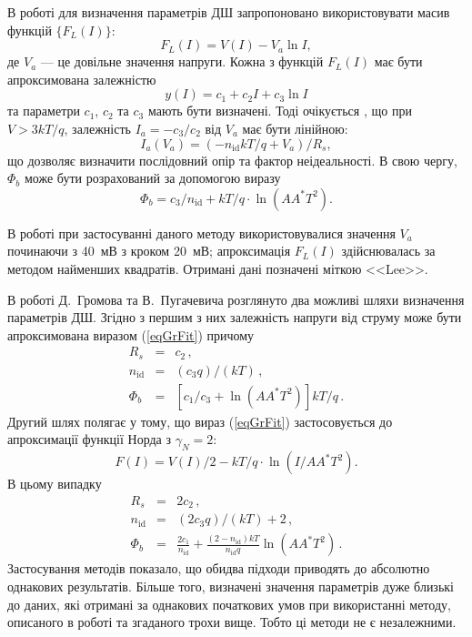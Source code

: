 В роботі \cite{Lee} для визначення параметрів ДШ запропоновано використовувати масив функцій $\{F_L(I)\}$:
\begin{equation}
\label{eqLee}
F_L(I)=V(I)-V_a\ln I,
\end{equation}
де
$V_a$ --- це довільне значення напруги.
Кожна з функцій $F_L(I)$ має бути апроксимована залежністю
\begin{equation}
\label{eqGrFit}
y(I)=c_1+c_2I+c_3\ln I
\end{equation}
та параметри $c_1$, $c_2$ та $c_3$ мають бути визначені.
Тоді очікується \cite{Lee}, що при $V>3kT/q$,
залежність $I_a=-c_3/c_2$ від $V_a$ має бути лінійною:
\begin{equation}
\label{eqLeeDet}
I_a(V_a)=(-n_\mathrm{id}kT/q+V_a)/R_s,
\end{equation}
що дозволяє визначити послідовний опір та фактор неідеальності.
В свою чергу, $\Phi_b$ може бути розрахований \cite{Lee} за допомогою виразу
\begin{equation}
\label{eqLeeFb}
\Phi_b=c_3/n_\mathrm{id}+kT/q\cdot\ln\left(AA^*T^2\right).
\end{equation}

В роботі при застосуванні даного методу використовувалися значення $V_a$ починаючи з 40~мВ з кроком 20~мВ;
апроксимація $F_L(I)$ здійснювалась за методом найменших квадратів.
Отримані дані позначені міткою <<Lee>>.

В роботі Д.~Громова та В.~Пугачевича \cite{Gromov} розглянуто два можливі шляхи визначення параметрів ДШ.
Згідно з першим з них залежність напруги від струму може бути апроксимована виразом (\ref{eqGrFit}) причому
\begin{eqnarray}
\label{eqGr1}
R_s&=&c_2\,,
\\
n_\mathrm{id}&=&(c_3q)/(kT)\,,
\\
\Phi_b&=&\left[c_1/c_3+\ln\left(AA^*T^2\right)\right]kT/q\,.
\end{eqnarray}
Другий шлях полягає у тому, що вираз (\ref{eqGrFit}) застосовується до апроксимації функції Норда з $\gamma_N=2$:
\begin{equation}
\label{eqGr2}
F(I)=V(I)/2-kT/q\cdot\ln(I/AA^*T^2).
\end{equation}
В цьому випадку \cite{Gromov}
\begin{eqnarray}
\label{eqGr2Det}
R_s&=&2c_2\,,
\\
n_\mathrm{id}&=&(2c_3q)/(kT)+2\,,
\\
\Phi_b&=&\frac{2c_1}{n_\mathrm{id}}+\frac{(2-n_\mathrm{id})kT}{n_\mathrm{id}q}\ln\left(AA^*T^2\right)\,.
\end{eqnarray}
Застосування методів показало, що обидва підходи приводять до абсолютно однакових результатів.
Більше того, визначені значення параметрів дуже близькі до даних, які отримані за однакових початкових умов при використанні методу, описаного в роботі \cite{Lee} та згаданого трохи вище.
Тобто ці методи не є незалежними.


